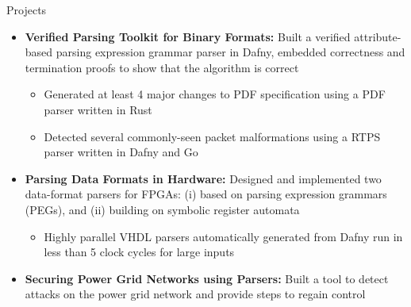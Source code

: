 \documentclass[]{mcdowellcv}
\begin{document}
	\begin{cvsection}{Projects}
		\begin{cvsubsection}{}{}{}
			\begin{itemize}
        \item \textbf{Verified Parsing Toolkit for Binary Formats:} Built a verified attribute-based parsing expression grammar parser in Dafny, embedded correctness and termination proofs to show that the algorithm is correct
        \begin{itemize}
          \item Generated at least 4 major changes to PDF specification using a PDF parser written in Rust
          \item Detected several commonly-seen packet malformations using a RTPS parser written in Dafny and Go
        \end{itemize}
        \item \textbf{Parsing Data Formats in Hardware:} Designed and implemented two data-format parsers for FPGAs: (i) based on parsing expression grammars (PEGs), and (ii) building on symbolic register automata
        \begin{itemize}
          \item Highly parallel VHDL parsers automatically generated from Dafny run in less than 5 clock cycles for large inputs
        \end{itemize}
        \item \textbf{Securing Power Grid Networks using Parsers:} Built a tool to detect attacks on the power grid network and provide steps to regain control

\end{itemize}
\end{cvsubsection}
\end{cvsection}
\end{document}
